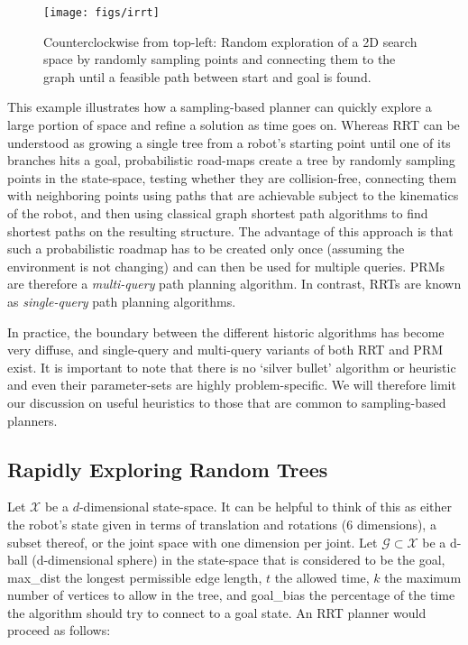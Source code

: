 \begin{figure}
    \centering
    \texttt{[image: figs/irrt]}
    \caption{Counterclockwise from top-left: Random exploration of a 2D search space by randomly sampling points and connecting them to the graph until a feasible path between start and goal is found.\label{fig:rrt}}
\end{figure}

This example illustrates how a sampling-based planner can quickly explore a large portion of space and refine a solution as time goes on. Whereas RRT can be understood as growing a single tree from a robot's starting point until one of its branches hits a goal, probabilistic road-maps create a tree by randomly sampling points in the state-space, testing whether they are collision-free, connecting them with neighboring points using paths that are achievable subject to the kinematics of the robot, and then using classical graph shortest path algorithms to find shortest paths on the resulting structure. The advantage of this approach is that such a probabilistic roadmap has to be created only once (assuming the environment is not changing) and can then be used for multiple queries. PRMs are therefore a \textsl{multi-query} path planning algorithm. In contrast, RRTs are known as \textsl{single-query} path planning algorithms.

In practice, the boundary between the different historic algorithms has become very diffuse, and single-query and multi-query variants of both RRT and PRM exist. It is important to note that there is no `silver bullet' algorithm or heuristic and even their parameter-sets are highly problem-specific. We will therefore limit our discussion on useful heuristics to those that are common to sampling-based planners.

\subsection{Rapidly Exploring Random Trees}
Let $ \mathcal{X}$ be a $ d$-dimensional state-space. It can be helpful to think of this as either the robot's state given in terms of translation and rotations (6 dimensions), a subset thereof, or the joint space with one dimension per joint. Let $ \mathcal{G} \subset \mathcal{X}$ be a  d-ball (d-dimensional sphere) in the state-space that is considered to be the goal, max\_dist the longest permissible edge length, $t$ the allowed time, $k$ the maximum number of vertices to allow in the tree, and goal\_bias the percentage of the time the algorithm should try to connect to a goal state. An RRT planner would proceed as follows:


